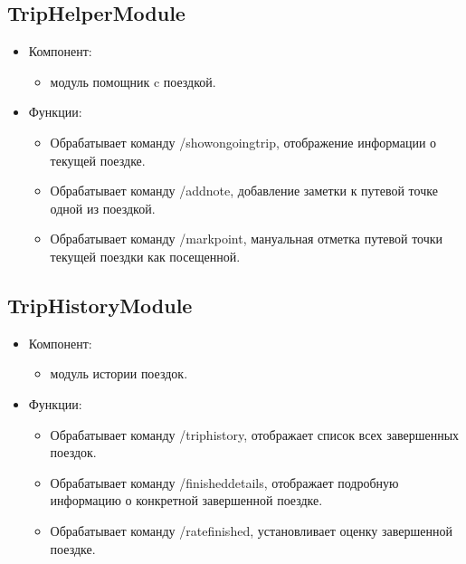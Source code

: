 \documentclass[areasetadvanced]{scrartcl}
\begin{document}

\newpage

\subsection{TripHelperModule}
\begin{itemize}
  \item Компонент: 
  \begin{itemize}
    \item модуль помощник c поездкой.
  \end{itemize} 
  \item Функции: 
  \begin{itemize}
    \item Обрабатывает команду /showongoingtrip, отображение информации о текущей поездке.
    \item Обрабатывает команду /addnote, добавление заметки к путевой точке одной из поездкой.
    \item Обрабатывает команду /markpoint, мануальная отметка путевой точки текущей поездки как посещенной.
  \end{itemize}
\end{itemize}


\newpage

\subsection{TripHistoryModule}
\begin{itemize}
  \item Компонент: 
  \begin{itemize}
    \item модуль истории поездок.
  \end{itemize} 
  \item Функции: 
  \begin{itemize}
    \item Обрабатывает команду /triphistory, отображает список всех
    завершенных поездок.
    \item Обрабатывает команду /finisheddetails, отображает подробную
      информацию о конкретной завершенной поездке.
    \item Обрабатывает команду /ratefinished, установливает оценку
      завершенной поездке.
  \end{itemize}
\end{itemize}


\newpage
\end{document}
